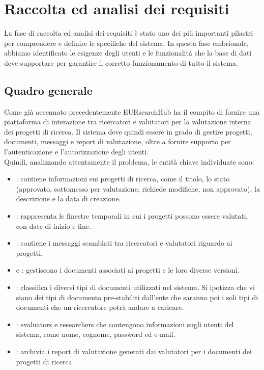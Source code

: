 \documentclass{report}
\begin{document}
\section{Raccolta ed analisi dei requisiti}
La fase di raccolta ed analisi dei requisiti è stato uno dei più importanti pilastri per comprendere e definire le specifiche del sistema. In questa fase embrionale, abbiamo identificato le esigenze degli utenti e le funzionalità che la base di dati deve supportare per garantire il corretto funzionamento di tutto il sistema. 
\subsection{Quadro generale}
Come già accennato precedentemente EURsearchHub ha il compito di fornire una piattaforma di interazione tra ricercatori e valutatori per la valutazione interna dei progetti di ricerca. Il sistema deve quindi essere in grado di gestire progetti, documenti, messaggi e report di valutazione, oltre a fornire supporto per l'autenticazione e l'autorizzazione degli utenti.\\
Quindi, analizzando attentamente il problema, le entità chiave individuate sono:

\begin{itemize}
    \item {}: contiene informazioni sui progetti di ricerca, come il titolo, lo stato (approvato, sottomesso per valutazione, richiede modifiche, non approvato), la descrizione e la data di creazione.
    \item {}: rappresenta le finestre temporali in cui i progetti possono essere valutati, con date di inizio e fine.
        \item {}: contiene i messaggi scambiati tra ricercatori e valutatori riguardo ai progetti.
        
    \item {} e  : gestiscono i documenti associati ai progetti e le loro diverse versioni.

    \item {}: classifica i diversi tipi di documenti utilizzati nel sistema. Si ipotizza che vi siano dei tipi di documento pre-stabiliti dall'ente che saranno poi i soli tipi di documenti che un ricercatore potrà andare a caricare. 

    \item {}: evaluators e researchers che contengono informazioni sugli utenti del sistema, come nome, cognome, password ed e-mail.
    
    
    \item {}: archivia i report di valutazione generati dai valutatori per i documenti dei progetti di ricerca.


    \end{itemize}
\end{document}

